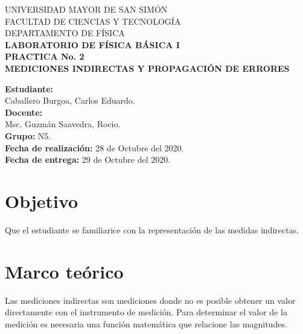 \documentclass[letter,11pt]{article}
\newcommand{\blankpage}{
\newpage
\thispagestyle{empty}
\mbox{}
\newpage
}
\begin{document}
\begin{titlepage}
\begin{center}
{\Large UNIVERSIDAD MAYOR DE SAN SIMÓN}\\
\vspace*{0.15cm}
{\large FACULTAD DE CIENCIAS Y TECNOLOGÍA}\\
\vspace*{0.10cm}
DEPARTAMENTO DE FÍSICA\\
\vspace*{3.0cm}
{\Large \textbf{LABORATORIO DE FÍSICA BÁSICA I}}\\
\vspace*{0.3cm}
{\Large \textbf{PRACTICA No. 2}}\\
\vspace*{3.5cm}
{\Large \textbf{MEDICIONES INDIRECTAS Y PROPAGACIÓN DE ERRORES}}\\
\end{center}

\vspace*{6.9cm}
\leftskip=7.95cm
\noindent
\textbf{Estudiante:}\\
Caballero Burgoa, Carlos Eduardo.\\
\newline
\textbf{Docente:}\\
Msc. Guzmán Saavedra, Rocio.\\
\newline
\textbf{Grupo:} N5.\\
\textbf{Fecha de realización:} 28 de Octubre del 2020.\\
\textbf{Fecha de entrega:} 29 de Octubre del 2020.\\

\end{titlepage}

\blankpage

\section{Objetivo}
Que el estudiante se familiarice con la representación de las medidas
indirectas.

\section{Marco teórico}
Las mediciones indirectas son mediciones donde no es posible obtener un valor
directamente con el instrumento de medición. Para determinar el valor de la
medición es necesaria una función matemática que relacione las magnitudes.
\end{document}
